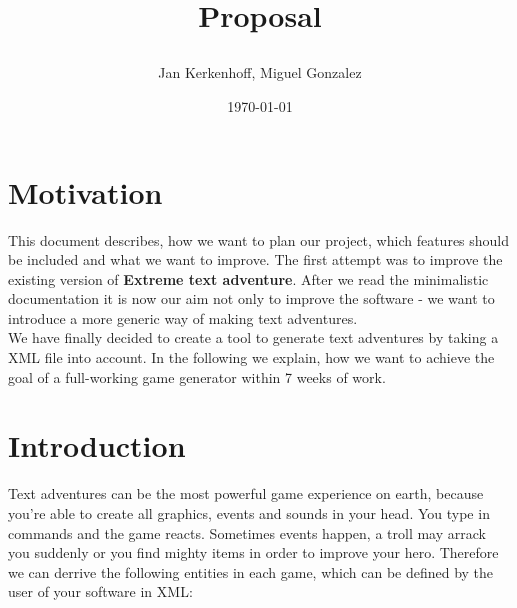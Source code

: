 \documentclass[dvips,12pt]{article}
\begin{document}
\title{
\begin{center}
\end{center}
Proposal
}

\author{Jan Kerkenhoff, Miguel Gonzalez}
\date{\today}

\maketitle

\section{Motivation}

This document describes, how we want to plan our project, which features should be included and what we want to improve. The first attempt was to improve the existing version of \textbf{Extreme text adventure}. After we read the minimalistic documentation it is now our aim not only to improve the software - we want to introduce a more generic way of making text adventures.\\

We have finally decided to create a tool to generate text adventures by taking a XML file into account. In the following we explain, how we want to achieve the goal of a full-working game generator within 7 weeks of work.

\section{Introduction}

Text adventures can be the most powerful game experience on earth, because you're able to create all graphics, events and sounds in your head. You type in commands and the game reacts. Sometimes events happen, a troll may arrack you suddenly or you find mighty items in order to improve your hero. Therefore we can derrive the following entities in each game, which can be defined by the user of your software in XML:
\end{document}
